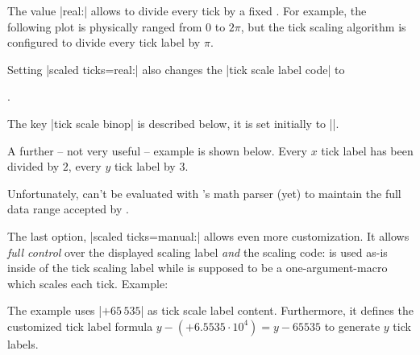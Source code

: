 \begin{pgfplotsxykeylist}
	The value |real:| allows to divide every tick by a fixed .
	For example, the following plot is physically ranged from $0$ to $2\pi$, but the tick scaling algorithm is configured to divide every tick label by $\pi$.
\begin{codeexample}[]
\end{codeexample}
	\noindent Setting |scaled ticks=real:| also changes the |tick scale label code| to
\begin{codeexample}
.
\end{codeexample}
\noindent The key |tick scale binop| is described below, it is set initially to |\cdot|.

A further -- not very useful -- example is shown below. Every $x$ tick label has been divided by $2$, every $y$ tick label by $3$.
\nobreak
\begin{codeexample}[]
\end{codeexample}

	Unfortunately,  can't be evaluated with \PGF's math parser (yet) to maintain the full data range accepted by \PGFPlots.

	The last option, |scaled ticks=manual:| allows even more customization. It allows \emph{full control} over the displayed scaling label \emph{and} the scaling code:  is used as-is inside of the tick scaling label while  is supposed to be a one-argument-macro which scales each tick. Example:
\begin{codeexample}[]
\end{codeexample}
\noindent The example uses |$+65\,535$| as tick scale label content. Furthermore, it defines the customized tick label formula $y - (+6.5535\cdot 10^4) = y - 65535$ to generate $y$ tick labels.


\end{pgfplotsxykeylist}
